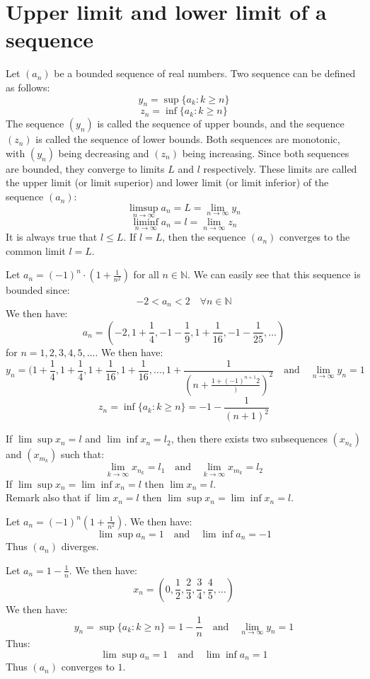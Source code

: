 \section{Upper limit and lower limit of a sequence}
\begin{definition}
    Let \( (a_n) \) be a bounded sequence of real numbers. Two sequence can be defined as follows:
    \[ y_n = \sup \{a_k : k \geq n\} \]
    \[ z_n = \inf \{a_k : k \geq n\} \]
    The sequence \( (y_n) \) is called the sequence of upper bounds, and the sequence \( (z_n) \) is called the sequence of lower bounds. Both sequences are monotonic, with \( (y_n) \) being decreasing and \( (z_n) \) being increasing. Since both sequences are bounded, they converge to limits \( L \) and \( l \) respectively. These limits are called the upper limit (or limit superior) and lower limit (or limit inferior) of the sequence \( (a_n) \):
    \[ \limsup_{n \to \infty} a_n = L = \lim_{n \to \infty} y_n \]
    \[ \liminf_{n \to \infty} a_n = l = \lim_{n \to \infty} z_n \]
    It is always true that \( l \leq L \).
    If \( l = L \), then the sequence \( (a_n) \) converges to the common limit \( l = L \).
\end{definition}
\begin{eg}
    Let $a_n = (-1)^n \cdot (1 + \frac{1}{n^2})$ for all $n \in \mathbb{N}$. We can easily see that this sequence is bounded since:
    \[ -2 < a_n < 2 \quad \forall n \in \mathbb{N} \]
    We then have:
    \[
        a_n = (-2, 1 + \frac{1}{4}, -1-\frac{1}{9}, 1 + \frac{1}{16}, -1 - \frac{1}{25}, \ldots)
    \]
    for $n = 1, 2, 3, 4, 5, \ldots$. We then have:
    \[ y_n = (1 + \frac{1}{4}, 1 + \frac{1}{4}, 1 + \frac{1}{16}, 1 + \frac{1}{16}, \ldots, 1 + \frac{1}{(n + \frac{1 + (-1)^{n + 1}{2}}))^2} \quad \text{and} \quad \lim_{n \to \infty} y_n = 1\]
    \[ z_n = \inf \{a_k : k \geq n\} = -1 - \frac{1}{(n + 1)^2} \]
\end{eg}
If $\lim \sup x_n = l$ and $\lim \inf x_n = l_2$, then there exists two subsequences $(x_{n_k})$ and $(x_{m_k})$ such that:
\[ \lim_{k \to \infty} x_{n_k} = l_1 \quad \text{and} \quad \lim_{k \to \infty} x_{m_k} = l_2 \]
If $\lim \sup x_n = \lim \inf x_n = l$ then $\lim x_n = l$. \\
Remark also that if $\lim x_n = l$ then $\lim \sup x_n = \lim \inf x_n = l$.

\begin{eg}
    Let $a_n = (-1)^n (1 + \frac{1}{n^2})$. We then have:
    \[ \lim \sup a_n = 1 \quad \text{and} \quad \lim \inf a_n = -1 \]
    Thus $(a_n)$ diverges.
\end{eg}
\begin{eg}
    Let $a_n = 1 - \frac{1}{n}$. We then have:
    \[
        x_n = (0, \frac{1}{2}, \frac{2}{3}, \frac{3}{4}, \frac{4}{5}, \ldots)
    \] 
    We then have:
    \[
        y_n = \sup \{a_k : k \geq n\} = 1 - \frac{1}{n} \quad \text{and} \quad \lim_{n \to \infty} y_n = 1
    \]
    Thus: 
    \[ \lim \sup a_n = 1 \quad \text{and} \quad \lim \inf a_n = 1 \]
    Thus $(a_n)$ converges to $1$.
\end{eg}